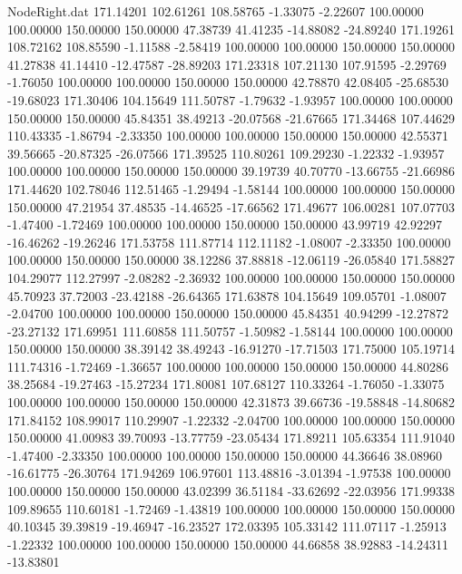 \begin{filecontents}{NodeRight.dat}
 171.14201  102.61261  108.58765    -1.33075   -2.22607  100.00000  100.00000  150.00000  150.00000   47.38739   41.41235  -14.88082  -24.89240
 171.19261  108.72162  108.85590    -1.11588   -2.58419  100.00000  100.00000  150.00000  150.00000   41.27838   41.14410  -12.47587  -28.89203
 171.23318  107.21130  107.91595    -2.29769   -1.76050  100.00000  100.00000  150.00000  150.00000   42.78870   42.08405  -25.68530  -19.68023
 171.30406  104.15649  111.50787    -1.79632   -1.93957  100.00000  100.00000  150.00000  150.00000   45.84351   38.49213  -20.07568  -21.67665
 171.34468  107.44629  110.43335    -1.86794   -2.33350  100.00000  100.00000  150.00000  150.00000   42.55371   39.56665  -20.87325  -26.07566
 171.39525  110.80261  109.29230    -1.22332   -1.93957  100.00000  100.00000  150.00000  150.00000   39.19739   40.70770  -13.66755  -21.66986
 171.44620  102.78046  112.51465    -1.29494   -1.58144  100.00000  100.00000  150.00000  150.00000   47.21954   37.48535  -14.46525  -17.66562
 171.49677  106.00281  107.07703    -1.47400   -1.72469  100.00000  100.00000  150.00000  150.00000   43.99719   42.92297  -16.46262  -19.26246
 171.53758  111.87714  112.11182    -1.08007   -2.33350  100.00000  100.00000  150.00000  150.00000   38.12286   37.88818  -12.06119  -26.05840
 171.58827  104.29077  112.27997    -2.08282   -2.36932  100.00000  100.00000  150.00000  150.00000   45.70923   37.72003  -23.42188  -26.64365
 171.63878  104.15649  109.05701    -1.08007   -2.04700  100.00000  100.00000  150.00000  150.00000   45.84351   40.94299  -12.27872  -23.27132
 171.69951  111.60858  111.50757    -1.50982   -1.58144  100.00000  100.00000  150.00000  150.00000   38.39142   38.49243  -16.91270  -17.71503
 171.75000  105.19714  111.74316    -1.72469   -1.36657  100.00000  100.00000  150.00000  150.00000   44.80286   38.25684  -19.27463  -15.27234
 171.80081  107.68127  110.33264    -1.76050   -1.33075  100.00000  100.00000  150.00000  150.00000   42.31873   39.66736  -19.58848  -14.80682
 171.84152  108.99017  110.29907    -1.22332   -2.04700  100.00000  100.00000  150.00000  150.00000   41.00983   39.70093  -13.77759  -23.05434
 171.89211  105.63354  111.91040    -1.47400   -2.33350  100.00000  100.00000  150.00000  150.00000   44.36646   38.08960  -16.61775  -26.30764
 171.94269  106.97601  113.48816    -3.01394   -1.97538  100.00000  100.00000  150.00000  150.00000   43.02399   36.51184  -33.62692  -22.03956
 171.99338  109.89655  110.60181    -1.72469   -1.43819  100.00000  100.00000  150.00000  150.00000   40.10345   39.39819  -19.46947  -16.23527
 172.03395  105.33142  111.07117    -1.25913   -1.22332  100.00000  100.00000  150.00000  150.00000   44.66858   38.92883  -14.24311  -13.83801

\end{filecontents}
